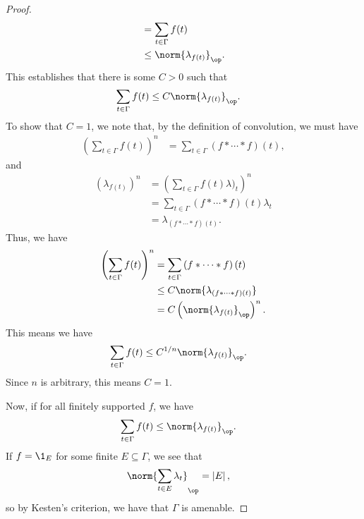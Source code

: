 \documentclass[10pt]{mypackage}
\begin{document}
\begin{proof}
\begin{align*}
                                                                                                                            &= \sum_{t\in\Gamma} f(t)\\
                                                                                                                            &\leq \norm{\lambda_{f(t)}}_{\op}.
  \end{align*}
  This establishes that there is some $C > 0$ such that
  \begin{align*}
    \sum_{t\in\Gamma}f(t) &\leq C\norm{\lambda_{f(t)}}_{\op}.
  \end{align*}
  To show that $C = 1$, we note that, by the definition of convolution, we must have
  \begin{align*}
    \left( \sum_{t\in\Gamma}f(t) \right)^{n} &= \sum_{t\in\Gamma} \left( f\ast \cdots \ast f \right)(t),
  \end{align*}
  and
  \begin{align*}
    \left( \lambda_{f(t)} \right)^{n} &= \left( \sum_{t\in\Gamma}f(t)\lambda)_t \right)^{n}\\
                                      &= \sum_{t\in\Gamma}\left( f\ast\cdots\ast f \right)\left( t \right)\lambda_t\\
                                      &= \lambda_{\left( f\ast\cdots\ast f \right)\left( t \right)}.
  \end{align*}
  Thus, we have
  \begin{align*}
    \left( \sum_{t\in\Gamma}f(t) \right)^{n}  &= \sum_{t\in\Gamma}\left( f\ast\cdots\ast f \right)\left( t \right)\\
                                              &\leq C\norm{\lambda_{\left( f\ast\cdots\ast f \right)\left( t \right)}}\\
                                              &= C\left( \norm{\lambda_{f(t)}}_{\op} \right)^n.
  \end{align*}
  This means we have
  \begin{align*}
    \sum_{t\in\Gamma}f(t) &\leq C^{1/n}\norm{\lambda_{f(t)}}_{\op}.
  \end{align*}
  Since $n$ is arbitrary, this means $C = 1$.\newline

  Now, if for all finitely supported $f$, we have
  \begin{align*}
    \sum_{t\in\Gamma} f(t) &\leq \norm{\lambda_{f(t)}}_{\op}.
  \end{align*}
  If $f = \1_{E}$ for some finite $E\subseteq \Gamma$, we see that
  \begin{align*}
    \norm{\sum_{t\in E}\lambda_{t}}_{\op} &= \left\vert E \right\vert,
  \end{align*}
  so by Kesten's criterion, we have that $\Gamma$ is amenable.
\end{proof}
\end{document}
